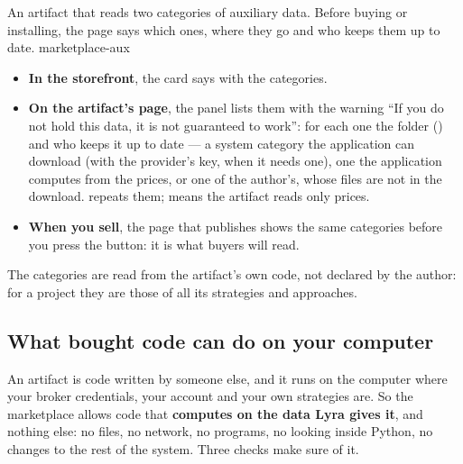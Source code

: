   {An artifact that reads two categories of auxiliary data. Before buying or
   installing, the page says which ones, where they go and who keeps them up
   to date.}
  {marketplace-aux}

\begin{itemize}
  \item \textbf{In the storefront}, the card says  with the
    categories.
  \item \textbf{On the artifact's page}, the  panel lists
    them with the warning \enquote{If you do not hold this data, it is not
    guaranteed to work}: for each one the folder () and who
    keeps it up to date --- a system category the application can download
    (with the provider's key, when it needs one), one the application
    computes from the prices, or one of the author's, whose files are not in
    the download.  repeats them;  means the
    artifact reads only prices.
  \item \textbf{When you sell}, the page that publishes shows the same
    categories before you press the button: it is what buyers will read.
\end{itemize}

\noindent
The categories are read from the artifact's own code, not declared by the
author: for a project they are those of all its strategies and approaches.

\subsection{What bought code can do on your computer}\label{sez:bought-code}

An artifact is code written by someone else, and it runs on the computer
where your broker credentials, your account and your own strategies are. So
the marketplace allows code that \textbf{computes on the data Lyra gives it},
and nothing else: no files, no network, no programs, no looking inside
Python, no changes to the rest of the system. Three checks make sure of it.

